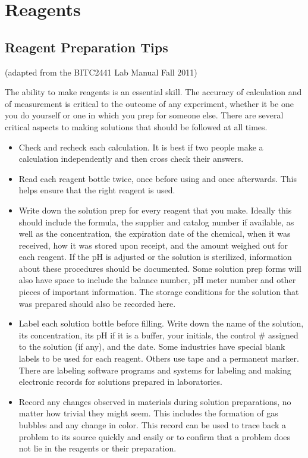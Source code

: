 \documentclass[11pt, oneside]{article}
\begin{document}
	\newpage




\section{Reagents}

	\subsection{Reagent Preparation Tips}

		(adapted from the BITC2441 Lab Manual Fall 2011)

		\hspace{1in} The ability to make reagents is an essential skill. The accuracy of calculation and of measurement is critical to the outcome of any 		experiment, whether it be one you do yourself or one in which you prep for someone else. There are several critical aspects to making solutions 		that should be followed at all times.  

		\begin{itemize}

			\item Check and recheck each calculation. It is best if two people make a calculation independently and then cross check their answers.  
			\item Read each reagent bottle twice, once before using and once afterwards. This helps ensure that the right reagent is used.  
			\item Write down the solution prep for every reagent that you make. Ideally this should include the formula, the supplier and catalog number 			if available, as well as the concentration, the expiration date of the chemical, when it was received, how it was stored upon receipt, and the 			amount weighed out for each reagent. If the pH is adjusted or the solution is sterilized, information about these procedures should be 				documented. Some solution prep forms will also have space to include the balance number, pH meter number and other pieces of 					important information. The storage conditions for the solution that was prepared should also be recorded here.  
			\item Label each solution bottle before filling. Write down the name of the solution, its concentration, its pH if it is a buffer, your initials, the 			control \# assigned to the solution (if any), and the date. Some industries have special blank labels to be used for each reagent. Others use 			tape and a permanent marker. There are labeling software programs and systems for labeling and making electronic records for solutions 			prepared in laboratories.  
			\item Record any changes observed in materials during solution preparations, no matter how trivial they might seem. This includes the 				formation of gas bubbles and any change in color. This record can be used to trace back a problem to its source quickly and easily or to 				confirm that a problem does not lie in the reagents or their preparation.

		\end{itemize}
\end{document}
